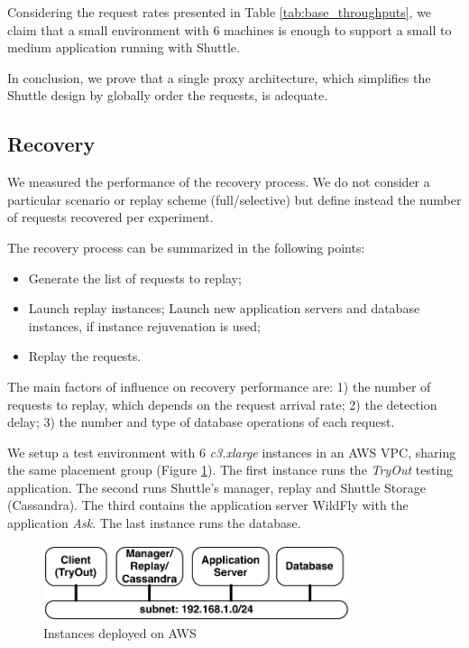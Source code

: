 Considering the request rates presented in Table \ref{tab:base_throughputs}, we claim that a small environment with 6 machines is enough to support a small to medium application running with Shuttle. 

In conclusion, we prove that a single proxy architecture, which simplifies the Shuttle design by globally order the requests, is adequate. 






\subsection{Recovery}\label{sec:eval:recovery}
We measured the performance of the recovery process. We do not consider a particular scenario or replay scheme (full/selective) but define instead the number of requests recovered per experiment.

The recovery process can be summarized in the following points:

\begin{itemize}
  \item Generate the list of requests to replay;
  \item Launch replay instances; Launch new application servers and database instances, if instance rejuvenation is used;
  \item Replay the requests.
\end{itemize}

The main factors of influence on recovery performance are: 1) the number of requests to replay, which depends on the request arrival rate; 2) the detection delay; 3) the number and type of database operations of each request.


We setup a test environment with 6 \emph{c3.xlarge} instances in an \ac{AWS} \acf{VPC}, sharing the same placement group (Figure \ref{fig:aws_diagram}). The first instance runs the \emph{TryOut} testing application. The second runs Shuttle's manager, replay and Shuttle Storage (Cassandra). The third contains the application server WildFly with the application \emph{Ask}. The last instance runs the database.

\begin{figure}[!htb]
  \centering
  \includegraphics[width=90mm]{images/aws_diagram}
  \caption{Instances deployed on \ac{AWS} }
  \label{fig:aws_diagram}
\end{figure}


